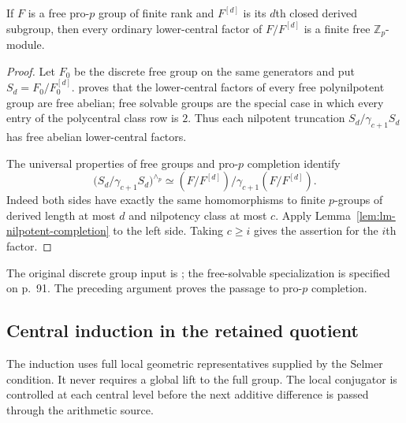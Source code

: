 \begin{lemma}
\label{lem:lm-free-solvable-pro-p-grades}
If $F$ is a free pro-$p$ group of finite rank and $F^{[d]}$
is its $d$th closed derived subgroup, then every ordinary
lower-central factor of $F/F^{[d]}$ is a finite free
$\mathbb Z_p$-module.
\end{lemma}
\begin{proof}
Let $F_0$ be the discrete free group on the same generators
and put $S_d=F_0/F_0^{[d]}$.  \citet[Theorem~3.1]{Shmelkin1964} proves that
the lower-central factors of every free polynilpotent group
are free abelian; free solvable groups are the special case
in which every entry of the polycentral class row is $2$.
Thus each nilpotent truncation
$S_d/\gamma_{c+1}S_d$ has free abelian lower-central factors.

The universal properties of free groups and pro-$p$
completion identify
\[
 \bigl(S_d/\gamma_{c+1}S_d\bigr)^{\wedge_p}
 \simeq (F/F^{[d]})/\gamma_{c+1}(F/F^{[d]}).
\]
Indeed both sides have exactly the same homomorphisms to
finite $p$-groups of derived length at most $d$ and
nilpotency class at most $c$.  Apply
Lemma~\ref{lem:lm-nilpotent-completion} to the left side.
Taking $c\ge i$ gives the assertion for the $i$th factor.
\end{proof}
The original discrete group input is
\citet[\S3, Theorem~3.1, p.~101]{Shmelkin1964}; the free-solvable
specialization is specified on p.~91.  The preceding argument proves
the passage to pro-$p$ completion.

\subsection{Central induction in the retained quotient}
\label{subsec:lm-unrestricted-full}

The induction uses full local geometric representatives supplied by
the Selmer condition.  It never requires a global lift to the full group.
The local conjugator is controlled at each central level before the
next additive difference is passed through the arithmetic source.

